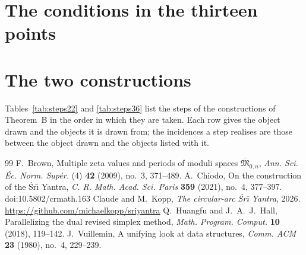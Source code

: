 \documentclass[11pt,a4paper]{article}
\theoremstyle{definition}
\theoremstyle{remark}
\newcommand{\Sri}{\'Sr\={\i}}
\begin{document}
\appendix
\section{The conditions in the thirteen points}\label{app:tables}
{\small

}

\section{The two constructions}\label{app:constructions}
Tables~\ref{tab:steps22} and \ref{tab:steps36} list the steps of the constructions of Theorem~B in the
order in which they are taken. Each row gives the object drawn and the objects it is drawn from; the
incidences a step realises are those between the object drawn and the objects listed with it.


\clearpage

\begin{thebibliography}{99}
 F.~Brown, Multiple zeta values and periods of moduli spaces
$\overline{\mathfrak{M}}_{0,n}$, \emph{Ann. Sci. \'Ec. Norm. Sup\'er.} (4) \textbf{42} (2009), no.~3,
371--489.
 A.~Chiodo, On the construction of the \Sri{} Yantra, \emph{C. R. Math. Acad. Sci. Paris}
\textbf{359} (2021), no.~4, 377--397. doi:10.5802/crmath.163
 Claude and M.~Kopp, \emph{The circular-arc \Sri{} Yantra}, 2026.
\url{https://github.com/michaelkopp/sriyantra}
 Q.~Huangfu and J.~A.~J.~Hall, Parallelizing the dual revised simplex method,
\emph{Math. Program. Comput.} \textbf{10} (2018), 119--142.
 J.~Vuillemin, A unifying look at data structures, \emph{Comm. ACM} \textbf{23} (1980),
no.~4, 229--239.
\end{thebibliography}
\end{document}
